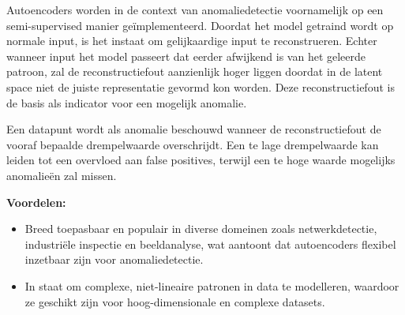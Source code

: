 Autoencoders worden in de context van anomaliedetectie voornamelijk op een semi-supervised manier geïmplementeerd. Doordat het model getraind wordt op normale input, is het instaat om gelijkaardige input te reconstrueren.
Echter wanneer input het model passeert dat eerder afwijkend is van het geleerde patroon, zal de reconstructiefout aanzienlijk hoger liggen doordat in de latent space niet de juiste representatie gevormd kon worden. Deze reconstructiefout is de basis als indicator voor een mogelijk anomalie\autocite{Chikezie2025}. 


Een datapunt wordt als anomalie beschouwd wanneer de reconstructiefout de vooraf bepaalde drempelwaarde overschrijdt. Een te lage drempelwaarde kan leiden tot een overvloed aan false positives, terwijl een te hoge waarde mogelijks anomalieën zal missen\autocite{Angiulli2023}.


\textbf{Voordelen:}
\begin{itemize}
    \item Breed toepasbaar en populair in diverse domeinen zoals netwerkdetectie,
    industriële inspectie en beeldanalyse, wat aantoont dat autoencoders flexibel
    inzetbaar zijn voor anomaliedetectie.
    \item In staat om complexe, niet-lineaire patronen in data te modelleren,
    waardoor ze geschikt zijn voor hoog-dimensionale en complexe datasets.
\end{itemize}

